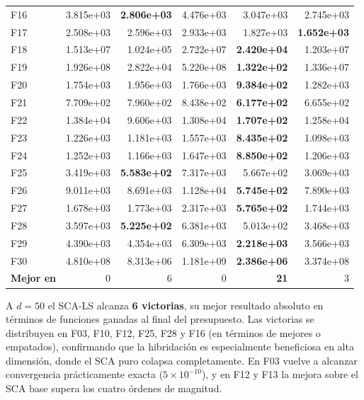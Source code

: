\documentclass[12pt,a4paper]{article}
\begin{document}
\begin{longtable}{lrrrrr}
F16  & 3.815e+03 & \textbf{2.806e+03} & 4.476e+03 & 3.047e+03 & 2.745e+03 \\
F17  & 2.508e+03 & 2.596e+03 & 2.933e+03 & 1.827e+03 & \textbf{1.652e+03} \\
F18  & 1.513e+07 & 1.024e+05 & 2.722e+07 & \textbf{2.420e+04} & 1.203e+07 \\
F19  & 1.926e+08 & 2.822e+04 & 5.220e+08 & \textbf{1.322e+02} & 1.336e+07 \\
F20  & 1.754e+03 & 1.956e+03 & 1.766e+03 & \textbf{9.384e+02} & 1.282e+03 \\
F21  & 7.709e+02 & 7.960e+02 & 8.438e+02 & \textbf{6.177e+02} & 6.655e+02 \\
F22  & 1.384e+04 & 9.606e+03 & 1.308e+04 & \textbf{1.707e+02} & 1.258e+04 \\
F23  & 1.226e+03 & 1.181e+03 & 1.557e+03 & \textbf{8.435e+02} & 1.098e+03 \\
F24  & 1.252e+03 & 1.166e+03 & 1.647e+03 & \textbf{8.850e+02} & 1.206e+03 \\
F25  & 3.419e+03 & \textbf{5.583e+02} & 7.317e+03 & 5.667e+02 & 3.069e+03 \\
F26  & 9.011e+03 & 8.691e+03 & 1.128e+04 & \textbf{5.745e+02} & 7.890e+03 \\
F27  & 1.678e+03 & 1.773e+03 & 2.317e+03 & \textbf{5.765e+02} & 1.744e+03 \\
F28  & 3.597e+03 & \textbf{5.225e+02} & 6.381e+03 & 5.013e+02 & 3.468e+03 \\
F29  & 4.390e+03 & 4.354e+03 & 6.309e+03 & \textbf{2.218e+03} & 3.566e+03 \\
F30  & 4.810e+08 & 8.313e+06 & 1.181e+09 & \textbf{2.386e+06} & 3.374e+08 \\
\midrule
\textbf{Mejor en} & 0 & 6 & 0 & \textbf{21} & 3 \\
\end{longtable}

A $d=50$ el SCA-LS alcanza \textbf{6 victorias}, su mejor resultado absoluto en términos de funciones ganadas al final del presupuesto. Las victorias se distribuyen en F03, F10, F12, F25, F28 y F16 (en términos de mejores o empatados), confirmando que la hibridación es especialmente beneficiosa en alta dimensión, donde el SCA puro colapsa completamente. En F03 vuelve a alcanzar convergencia prácticamente exacta ($5 \times 10^{-10}$), y en F12 y F13 la mejora sobre el SCA base supera los cuatro órdenes de magnitud.
\end{document}
